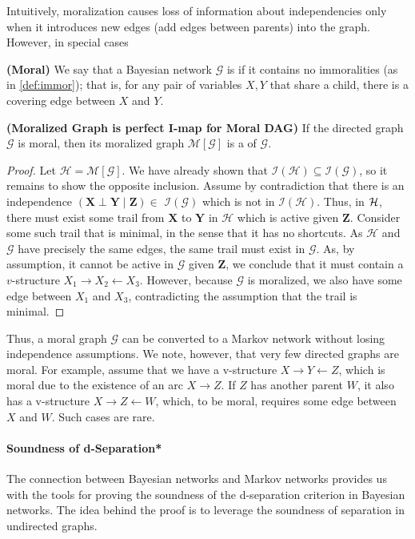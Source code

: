 \documentclass{article}
\newcommand{\bfs}[1]{\textbf{({#1}) }}
\begin{document}
 Intuitively, moralization causes loss of information about independencies only when it introduces new edges (add edges between parents) into the graph. However, in special cases
 \begin{defa}\bfs{Moral}
 We say that a Bayesian network $\mathcal{G}$ is  if it contains no immoralities (as in \cref{def:immor}); that is, for any pair of variables $X, Y$ that share a child, there is a covering edge between $X$ and $Y$. 
 \end{defa}
 \begin{thma}\bfs{Moralized Graph is perfect I-map for Moral DAG}\label{thm:hddad}
 If the directed graph $\mathcal{G}$ is moral, then its moralized graph $\mathcal{M}[\mathcal{G}]$ is a  of $\mathcal{G}$.
 \end{thma}
\begin{proof}
Let $\mathcal{H}=\mathcal{M}[\mathcal{G}]$. We have already shown that $\mathcal{I}(\mathcal{H}) \subseteq \mathcal{I}(\mathcal{G})$, so it remains to show the opposite inclusion. Assume by contradiction that there is an independence $(\boldsymbol{X} \perp \boldsymbol{Y} \mid \boldsymbol{Z}) \in$ $\mathcal{I}(\mathcal{G})$ which is not in $\mathcal{I}(\mathcal{H})$. Thus, in $\mathcal{H}$, there must exist some trail from $\boldsymbol{X}$ to $\boldsymbol{Y}$ in $\mathcal{H}$ which is active given $\boldsymbol{Z}$. Consider some such trail that is minimal, in the sense that it has no shortcuts. As $\mathcal{H}$ and $\mathcal{G}$ have precisely the same edges, the same trail must exist in $\mathcal{G}$. As, by assumption, it cannot be active in $\mathcal{G}$ given $\boldsymbol{Z}$, we conclude that it must contain a $v$-structure $X_{1} \rightarrow X_{2} \leftarrow X_{3}$. However, because $\mathcal{G}$ is moralized, we also have some edge between $X_{1}$ and $X_{3}$, contradicting the assumption that the trail is minimal.
\end{proof}
\begin{rema}
 Thus, a moral graph $\mathcal{G}$ can be converted to a Markov network without losing independence assumptions.  We note, however, that very few directed graphs are moral. For example, assume that we have a v-structure $X \rightarrow Y \leftarrow Z$, which is moral due to the existence of an arc $X \rightarrow Z$. If $Z$ has another parent $W$, it also has a v-structure $X \rightarrow Z \leftarrow W$, which, to be moral, requires some edge between $X$ and $W$. Such cases are rare.
\end{rema}
\paragraph{Soundness of d-Separation*}\label{sec:meqkdka}
The connection between Bayesian networks and Markov networks provides us with the tools for proving the soundness of the d-separation criterion in Bayesian networks. The idea behind the proof is to leverage the soundness of separation in undirected graphs.
\end{document}

